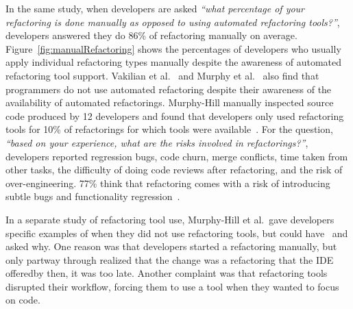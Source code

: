 In the same study, when developers are asked {\it ``what percentage of your refactoring is done manually as opposed to using automated refactoring tools?''}, developers answered they do 86\% of refactoring manually on average. Figure~\ref{fig:manualRefactoring} shows the percentages of developers who usually apply individual refactoring types manually despite the awareness of automated refactoring tool support. Vakilian et al.~\cite{Vakilian:2012} and Murphy et al.~\cite{Murphy2006:JSD} also find that programmers do not use automated refactoring despite their awareness of the availability of automated refactorings. Murphy-Hill manually inspected source code produced by 12 developers and found that developers only used refactoring tools for 10\% of refactorings for which tools were available~\cite{Murphy-Hill2012:refactor}. For the question, {\it ``based on your experience, what are the risks involved in refactorings?''}, developers reported regression bugs, code churn, merge conflicts, time taken from other tasks, the difficulty of doing code reviews after refactoring, and the risk of over-engineering. 77\% think that refactoring comes with a risk of introducing subtle bugs and functionality regression~\cite{Kim2012:FSR}.

In a separate study of refactoring tool use, Murphy-Hill et al.~gave developers specific examples of when they did not use refactoring tools, but could have~\cite{Murphy-Hill2012:refactor} and asked why. One reason was that developers started a refactoring manually, but only partway through realized that the change was a refactoring that the IDE offered\textemdash by then, it was too late.  Another complaint was that refactoring tools disrupted their workflow, forcing them to use a tool when they wanted to focus on code.  

